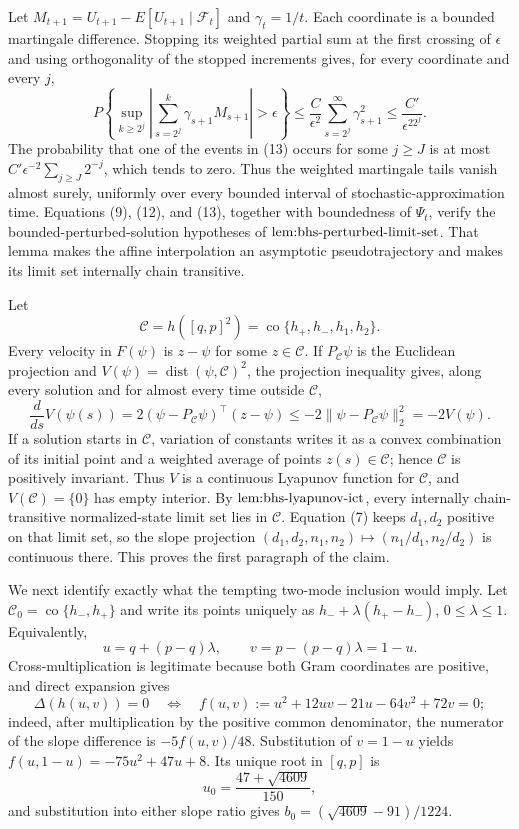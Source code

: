Let \(M_{t+1}=U_{t+1}-E[U_{t+1}\mid\mathcal F_t]\) and \(\gamma_t=1/t\).  Each coordinate is a bounded martingale difference.  Stopping its weighted partial sum at the first crossing of \(\epsilon\) and using orthogonality of the stopped increments gives, for every coordinate and every \(j\),
\[
 P\left\{\sup_{k\geq2^j}\left|\sum_{s=2^j}^k\gamma_{s+1}M_{s+1}\right|>\epsilon\right\}
 \leq \frac{C}{\epsilon^2}\sum_{s=2^j}^{\infty}\gamma_{s+1}^2
 \leq\frac{C'}{\epsilon^22^j}. \tag{13}
\]
The probability that one of the events in (13) occurs for some \(j\geq J\) is at most \(C'\epsilon^{-2}\sum_{j\geq J}2^{-j}\), which tends to zero.  Thus the weighted martingale tails vanish almost surely, uniformly over every bounded interval of stochastic-approximation time.  Equations (9), (12), and (13), together with boundedness of \(\Psi_t\), verify the bounded-perturbed-solution hypotheses of \(\textnormal{lem:bhs-perturbed-limit-set}\).  That lemma makes the affine interpolation an asymptotic pseudotrajectory and makes its limit set internally chain transitive.

Let
\[
 \mathcal C=h([q,p]^2)=\operatorname{co}\{h_+,h_-,h_1,h_2\}.
\]
Every velocity in \(F(\psi)\) is \(z-\psi\) for some \(z\in\mathcal C\).  If \(P_{\mathcal C}\psi\) is the Euclidean projection and \(V(\psi)=\operatorname{dist}(\psi,\mathcal C)^2\), the projection inequality gives, along every solution and for almost every time outside \(\mathcal C\),
\[
 \frac{d}{ds}V(\psi(s))
 =2(\psi-P_{\mathcal C}\psi)^\top(z-\psi)
 \leq-2\|\psi-P_{\mathcal C}\psi\|_2^2=-2V(\psi). \tag{14}
\]
If a solution starts in \(\mathcal C\), variation of constants writes it as a convex combination of its initial point and a weighted average of points \(z(s)\in\mathcal C\); hence \(\mathcal C\) is positively invariant.  Thus \(V\) is a continuous Lyapunov function for \(\mathcal C\), and \(V(\mathcal C)=\{0\}\) has empty interior.  By \(\textnormal{lem:bhs-lyapunov-ict}\), every internally chain-transitive normalized-state limit set lies in \(\mathcal C\).  Equation (7) keeps \(d_1,d_2\) positive on that limit set, so the slope projection \((d_1,d_2,n_1,n_2)\mapsto(n_1/d_1,n_2/d_2)\) is continuous there.  This proves the first paragraph of the claim.

We next identify exactly what the tempting two-mode inclusion would imply.  Let \(\mathcal C_0=\operatorname{co}\{h_-,h_+\}\) and write its points uniquely as \(h_-+\lambda(h_+-h_-)\), \(0\leq\lambda\leq1\).  Equivalently,
\[
 u=q+(p-q)\lambda,\qquad v=p-(p-q)\lambda=1-u. \tag{15}
\]
Cross-multiplication is legitimate because both Gram coordinates are positive, and direct expansion gives
\[
 \Delta(h(u,v))=0
 \quad\Longleftrightarrow\quad
 f(u,v):=u^2+12uv-21u-64v^2+72v=0; \tag{16}
\]
indeed, after multiplication by the positive common denominator, the numerator of the slope difference is \(-5f(u,v)/48\).  Substitution of \(v=1-u\) yields \(f(u,1-u)=-75u^2+47u+8\).  Its unique root in \([q,p]\) is
\[
 u_0=\frac{47+\sqrt{4609}}{150},
\]
and substitution into either slope ratio gives \(b_0=(\sqrt{4609}-91)/1224\).


